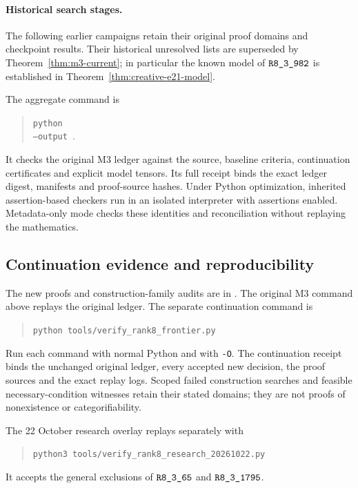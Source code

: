 \paragraph{Historical search stages.}
The following earlier campaigns retain their original proof domains and
checkpoint results. Their historical unresolved lists are superseded by
Theorem~\ref{thm:m3-current}; in particular the known model of
$\sha{R8_3_982}$ is established in Theorem~\ref{thm:creative-e21-model}.

The aggregate command is
\begin{quote}\small
\texttt{python }\\
\texttt{--output }.
\end{quote}
It checks the original M3 ledger against the source, baseline criteria,
continuation certificates and explicit model tensors. Its full receipt
binds the exact ledger digest, manifests and proof-source hashes. Under
Python optimization, inherited assertion-based checkers run in an isolated
interpreter with assertions enabled. Metadata-only mode checks these
identities and reconciliation without replaying the mathematics.









\subsection{Continuation evidence and reproducibility}
The new proofs and construction-family audits are in
. The original M3 command above
replays the original ledger. The separate continuation command is
\begin{quote}\small
\verb|python tools/verify_rank8_frontier.py|
\end{quote}
Run each command with normal Python and with \texttt{-O}. The continuation
receipt binds the unchanged original ledger, every accepted new decision,
the proof sources and the exact replay logs. Scoped failed construction
searches and feasible necessary-condition witnesses retain their stated
domains; they are not proofs of nonexistence or categorifiability.

The 22 October research overlay replays separately with
\begin{quote}\small\verb|python3 tools/verify_rank8_research_20261022.py|\end{quote}
It accepts the general exclusions of $\sha{R8_3_65}$ and $\sha{R8_3_1795}$.

